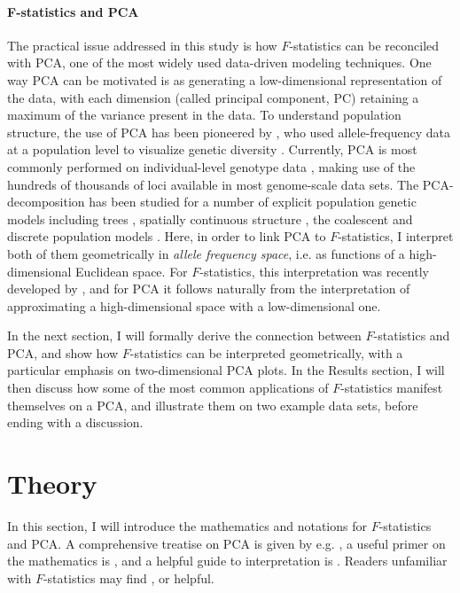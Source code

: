 \documentclass[12pt,fullpage, a4paper]{article}
\begin{document}
\paragraph{F-statistics and PCA}
The practical issue addressed in this study is how $F$-statistics can be reconciled with PCA, one of the most widely used data-driven modeling  techniques. One way PCA can be motivated is as generating a low-dimensional representation of the data, with each dimension (called principal component, PC) retaining a maximum of the variance present in the data. To understand population structure, the use of PCA has been pioneered by \cite{cavalli-sforza1964}, who used allele-frequency data at a population level to visualize genetic diversity \citep{cavalli-sforza1994}. Currently, PCA is most commonly performed on individual-level genotype data \citep[e.g.][]{patterson2006, novembre2008}, making use of the hundreds of thousands of loci available in most genome-scale data sets. 
The PCA-decomposition has been studied for a number of explicit population genetic models including trees \citep{cavalli-sforza1975}, spatially continuous structure \citep{novembre2008a}, the coalescent \citep{mcvean2009} and discrete population models \citep{francois2021}. Here, in order to link PCA to $F$-statistics, I interpret both of them geometrically in \emph{allele frequency space}, i.e. as functions of a high-dimensional Euclidean space. For $F$-statistics, this interpretation was recently developed by \cite{oteo-garcia2021}, and for PCA it follows naturally from the interpretation of approximating a high-dimensional space with a low-dimensional one.

In the next section, I will formally derive the connection between $F$-statistics and PCA, and show how $F$-statistics can be interpreted geometrically, with a particular emphasis on two-dimensional PCA plots. In the Results section, I will then discuss how some of the most common applications of $F$-statistics manifest themselves on a PCA, and illustrate them on two example data sets, before ending with a discussion.

	
\section{Theory}
In this section, I will introduce the mathematics and notations for $F$-statistics and PCA. A comprehensive  treatise on PCA is given by e.g. \cite{jolliffe2013}, a useful primer on the mathematics is \cite{pachter2014}, and a helpful guide to interpretation is \cite{cavalli-sforza1994}. Readers unfamiliar with $F$-statistics may find \cite{patterson2012}, \cite{peter2016} or \cite{oteo-garcia2021} helpful.
\end{document}
